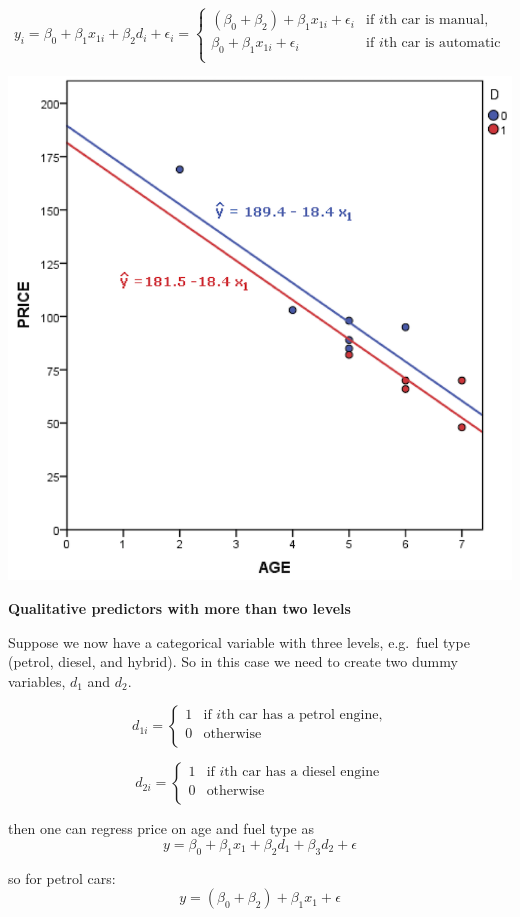 \documentclass[
]{article}
\begin{document}
\[y_i=\beta_0+\beta_1 x_{1i}+ \beta_2 d_i+\epsilon_i =\left\{\begin{array}{ll}
(\beta_0+\beta_2) + \beta_1 x_{1i}+\epsilon_i& \text{if $i$th car is manual,}\\
\beta_0+\beta_1 x_{1i}+\epsilon_i& \text{if $i$th car is automatic}\\
\end{array}\right.\]

\begin{center}\includegraphics[width=0.6\linewidth,height=0.6\textheight]{figures/fig1_dummy} \end{center}

\textbf{Qualitative predictors with more than two levels}

Suppose we now have a categorical variable with three levels, e.g.~fuel
type (petrol, diesel, and hybrid). So in this case we need to create two
dummy variables, \(d_1\) and \(d_2\).

\[d_{1i}=\left\{\begin{array}{ll}
1& \text{if $i$th car has a petrol engine,}\\
0& \text{otherwise}\\
\end{array}\right.\]

\[d_{2i}=\left\{\begin{array}{ll}
1& \text{if $i$th car has a diesel engine}\\
0& \text{otherwise}\\
\end{array}\right.\]

then one can regress price on age and fuel type as
\[y=\beta_0+\beta_1 x_{1}+\beta_2 d_{1}+\beta_3 d_{2}+\epsilon\]

so for petrol cars: \[y=(\beta_0+\beta_2)+\beta_1 x_{1}+\epsilon\]
\end{document}
